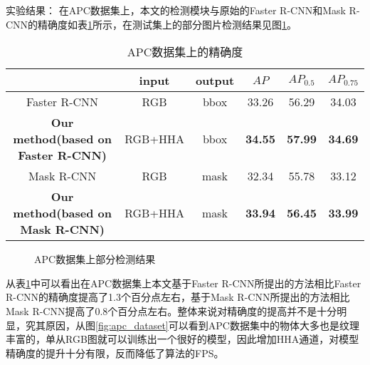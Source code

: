 {\kai 实验结果}：
在APC数据集上，本文的检测模块与原始的Faster R-CNN和Mask R-CNN的精确度如表\ref{tab:ap1}所示，在测试集上的部分图片检测结果见图\ref{fig:apc_res}。
\begin{table}[ht]
  \centering
  \caption{APC数据集上的精确度}
    \begin{tabular}{cccccc}
      \toprule
      &input&output&$AP$&$AP_{0.5}$&$AP_{0.75}$ \\
      \midrule
      Faster R-CNN&RGB&bbox&33.26&56.29&34.03 \\
      \bf{Our method(based on Faster R-CNN)}&RGB+HHA&bbox&\bf{34.55}&\bf{57.99}&\bf{34.69} \\
      Mask R-CNN&RGB&mask&32.34&55.78&33.12 \\
      \bf{Our method(based on Mask R-CNN)}&RGB+HHA&mask&\bf{33.94}&\bf{56.45}&\bf{33.99} \\
      \bottomrule
    \end{tabular}
  \label{tab:ap1}
\end{table}
\begin{figure}[ht]
  \centering
  \hskip2pt
  \hskip2pt
  \caption{APC数据集上部分检测结果}
  \label{fig:apc_res}
\end{figure}
从表\ref{tab:ap1}中可以看出在APC数据集上本文基于Faster R-CNN所提出的方法相比Faster R-CNN的精确度提高了1.3个百分点左右，基于Mask R-CNN所提出的方法相比Mask R-CNN提高了0.8个百分点左右。整体来说对精确度的提高并不是十分明显，究其原因，从图\ref{fig:apc_dataset}可以看到APC数据集中的物体大多也是纹理丰富的，单从RGB图就可以训练出一个很好的模型，因此增加HHA通道，对模型精确度的提升十分有限，反而降低了算法的FPS。

